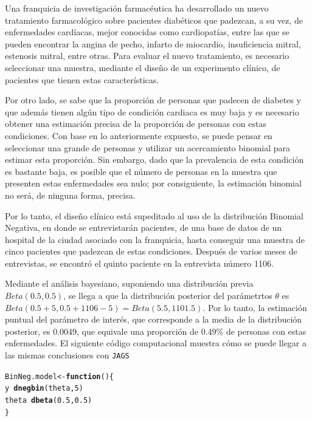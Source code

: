 \documentclass[10pt,openright]{book}\usepackage[]{graphicx}\usepackage[]{color}
\makeatletter
\newcommand{\hlnum}[1]{\textcolor[rgb]{0.686,0.059,0.569}{#1}}%
\newcommand{\hlopt}[1]{\textcolor[rgb]{0,0,0}{#1}}%
\newcommand{\hlstd}[1]{\textcolor[rgb]{0.345,0.345,0.345}{#1}}%
\newcommand{\hlkwa}[1]{\textcolor[rgb]{0.161,0.373,0.58}{\textbf{#1}}}%
\newcommand{\hlkwb}[1]{\textcolor[rgb]{0.69,0.353,0.396}{#1}}%
\newcommand{\hlkwd}[1]{\textcolor[rgb]{0.737,0.353,0.396}{\textbf{#1}}}%
\newenvironment{kframe}{%
 \def\at@end@of@kframe{}%
 \ifinner\ifhmode%
  \def\at@end@of@kframe{\end{minipage}}%
  \begin{minipage}{\columnwidth}%
 \fi\fi%
 \def\FrameCommand##1{\hskip\@totalleftmargin \hskip-\fboxsep
 \colorbox{shadecolor}{##1}\hskip-\fboxsep
     \hskip-\linewidth \hskip-\@totalleftmargin \hskip\columnwidth}%
 \MakeFramed {\advance\hsize-\width
   \@totalleftmargin\z@ \linewidth\hsize
   \@setminipage}}%
 {\par\unskip\endMakeFramed%
 \at@end@of@kframe}
\newenvironment{knitrout}{}{} %
\makeatother
\begin{document}
    \begin{Eje}
    Una franquicia de investigaci\'on farmac\'eutica ha desarrollado un nuevo tratamiento farmacol\'ogico sobre pacientes diab\'eticos que padezcan, a su vez, de enfermedades card\'iacas, mejor conocidas como cardiopat\'ias, entre las que se pueden encontrar la angina de pecho, infarto de miocardio,  insuficiencia mitral, estenosis mitral, entre otras. Para evaluar el nuevo tratamiento, es necesario seleccionar una muestra, mediante el dise\~no de un experimento cl\'inico, de pacientes que tienen estas caracter\'isticas.
    
    Por otro lado, se sabe que la proporci\'on de personas que padecen de diabetes y que adem\'as tienen alg\'un tipo de condici\'on cardiaca es muy baja y es necesario obtener una estimaci\'on precisa de la proporci\'on de personas con estas condiciones. Con base en lo anteriormente expuesto, se puede pensar en seleccionar una grande de personas y utilizar un acercamiento binomial para estimar esta proporci\'on. Sin embargo, dado que la prevalencia de esta condici\'on es bastante baja, es posible que el n\'umero de personas en la muestra que presenten estas enfermedades sea nulo; por consiguiente, la estimaci\'on binomial no ser\'a, de ninguna forma, precisa.
    
    Por lo tanto, el dise\~no cl\'inico est\'a supeditado al uso de la distribuci\'on Binomial Negativa, en donde se entrevistar\'an pacientes, de una base de datos de un hospital de la ciudad asociado con la franquicia, hasta conseguir una muestra de cinco pacientes que padezcan de estas condiciones. Despu\'es de varios meses de entrevistas, se encontr\'o el quinto paciente en la entrevista n\'umero 1106.
    
    Mediante el an\'alisis bayesiano, suponiendo una distribuci\'on previa $Beta(0.5, 0.5)$, se llega a que la distribuci\'on posterior del par\'ametrtos $\theta$ es $Beta(0.5+5, 0.5+1106-5)=Beta(5.5, 1101.5)$. Por lo tanto, la estimaci\'on puntual del par\'ametro de inter\'es, que corresponde a la media de la distribuci\'on posterior, es 0.0049, que equivale una proporci\'on de 0.49\% de personas con estas enfermedades. El siguiente c\'odigo computacional muestra c\'omo se puede llegar a las mismas conclusiones con \verb'JAGS'
    
\begin{knitrout}
\color{fgcolor}\begin{kframe}
\begin{alltt}
\hlstd{BinNeg.model} \hlkwb{<-} \hlkwa{function}\hlstd{()\{}
\hlstd{y} \hlopt{~} \hlkwd{dnegbin}\hlstd{(theta,}\hlnum{5}\hlstd{)}
\hlstd{theta}\hlopt{~}\hlkwd{dbeta}\hlstd{(}\hlnum{0.5}\hlstd{,} \hlnum{0.5}\hlstd{)}
\hlstd{\}}


\end{alltt}
\end{kframe}
\end{knitrout}
\end{Eje}
\end{document}
